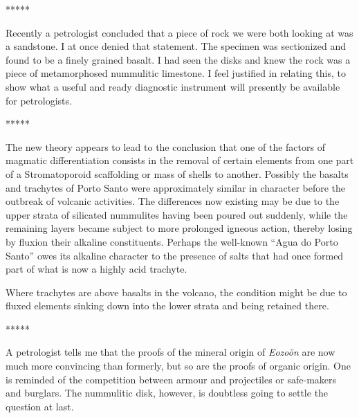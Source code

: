 \documentclass[a4paper, 12pt, oneside]{article}
\begin{document}
\centerline{*\hspace{15mm}*\hspace{15mm}*\hspace{15mm}*\hspace{15mm}*}
\bigskip

Recently a petrologist concluded that a piece of rock we were both looking at was a sandstone. I at once denied that statement. The specimen was sectionized and found to be a finely grained basalt. I had seen the disks and knew the rock was a piece of metamorphosed nummulitic limestone. I feel justified in relating this, to show what a useful and ready diagnostic instrument will presently be available for petrologists.

\centerline{*\hspace{15mm}*\hspace{15mm}*\hspace{15mm}*\hspace{15mm}*}
\bigskip

The new theory appears to lead to the conclusion that one of the factors of magmatic differentiation consists in the removal of certain elements from one part of a Stromatoporoid scaffolding or mass of shells to another. Possibly the basalts and trachytes of Porto Santo were approximately similar in character before the outbreak of volcanic activities. The differences now existing may be due to the upper strata of silicated nummulites having been poured out suddenly, while the remaining layers became subject to more prolonged igneous action, thereby losing by fluxion their alkaline constituents. Perhaps the well-known ``Agua do Porto Santo'' owes its alkaline character to the presence of salts that had once formed part of what is now a highly acid trachyte.

Where trachytes are above basalts in the volcano, the condition might be due to fluxed elements sinking down into the lower strata and being retained there.

\centerline{*\hspace{15mm}*\hspace{15mm}*\hspace{15mm}*\hspace{15mm}*}
\bigskip

A petrologist tells me that the proofs of the mineral origin of \emph{Eozoön} are now much more convincing than formerly, but so are the proofs of organic origin. One is reminded of the competition between armour and projectiles or safe-makers and burglars. The nummulitic disk, however, is doubtless going to settle the question at last.
\clearpage
\end{document}
